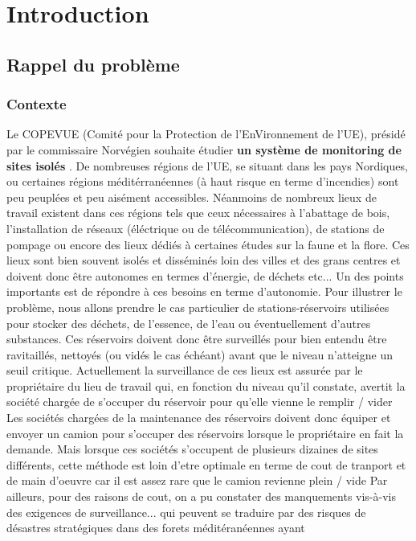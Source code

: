 \section{Introduction}
\subsection{Rappel du problème}
\subsubsection{Contexte}
Le COPEVUE (Comité pour la Protection de l'EnVironnement de l'UE), présidé par le commissaire Norvégien souhaite étudier \textbf {un système
de monitoring de sites isolés} .
De nombreuses régions de l'UE, se situant dans les pays Nordiques, ou certaines régions méditérranéennes (à haut risque en terme d'incendies) sont peu peuplées et peu aisément accessibles. Néanmoins
de nombreux lieux de travail existent dans ces régions tels que ceux nécessaires à l'abattage de bois, l'installation de réseaux (éléctrique ou de télécommunication),
de stations de pompage ou encore des lieux dédiés à certaines études sur la faune et la flore. Ces lieux sont bien souvent isolés et disséminés loin des villes et des grans centres et doivent donc être autonomes en termes 
d'énergie, de déchets etc...
Un des points importants est de répondre à ces besoins en terme d'autonomie.
Pour illustrer le problème, nous allons prendre le cas particulier de stations-réservoirs utilisées pour stocker des déchets, de l'essence, de l'eau ou éventuellement d'autres substances. Ces réservoirs doivent donc être
surveillés pour bien entendu être ravitaillés, nettoyés (ou vidés le cas échéant) avant que le niveau n'atteigne un seuil critique. Actuellement la surveillance de ces lieux est assurée par le propriétaire du lieu de travail qui, en fonction du niveau qu'il constate, avertit la société chargée de s'occuper du réservoir pour qu'elle vienne le remplir / vider
Les sociétés chargées de la maintenance des réservoirs doivent donc équiper et envoyer un camion pour s'occuper des réservoirs lorsque le propriétaire en fait la demande. Mais lorsque ces sociétés s'occupent de plusieurs dizaines de sites différents, cette méthode est loin d'etre optimale en terme de cout de tranport et de main d'oeuvre car il est assez rare que le camion revienne plein / vide
Par ailleurs, pour des raisons de cout, on a pu constater des manquements vis-à-vis des exigences de surveillance... qui peuvent se traduire par des risques de désastres stratégiques dans des forets méditéranéennes ayant
